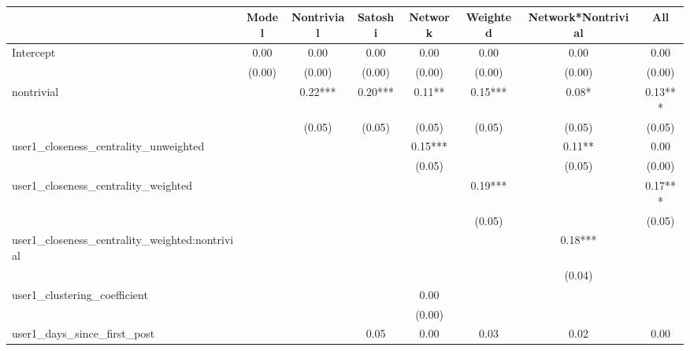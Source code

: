 \begin{table}
\centering
\caption{}
\begin{center}
\begin{tabular}{lccccccc}
\hline
                                               & Model    & Nontrivial & Satoshi & Network & Weighted & Network*Nontrivial &   All    \\
\hline
\hline
Intercept                                      & 0.00     & 0.00       & 0.00    & 0.00    & 0.00     & 0.00               & 0.00     \\
                                               & (0.00)   & (0.00)     & (0.00)  & (0.00)  & (0.00)   & (0.00)             & (0.00)   \\
nontrivial                                     &          & 0.22***    & 0.20*** & 0.11**  & 0.15***  & 0.08*              & 0.13***  \\
                                               &          & (0.05)     & (0.05)  & (0.05)  & (0.05)   & (0.05)             & (0.05)   \\
user1_closeness_centrality_unweighted          &          &            &         & 0.15*** &          & 0.11**             & 0.00     \\
                                               &          &            &         & (0.05)  &          & (0.05)             & (0.00)   \\
user1_closeness_centrality_weighted            &          &            &         &         & 0.19***  &                    & 0.17***  \\
                                               &          &            &         &         & (0.05)   &                    & (0.05)   \\
user1_closeness_centrality_weighted:nontrivial &          &            &         &         &          & 0.18***            &          \\
                                               &          &            &         &         &          & (0.04)             &          \\
user1_clustering_coefficient                   &          &            &         & 0.00    &          &                    &          \\
                                               &          &            &         & (0.00)  &          &                    &          \\
user1_days_since_first_post                    &          &            & 0.05    & 0.00    & 0.03     & 0.02               & 0.00     \\

\end{tabular}
\end{center}
\end{table}

